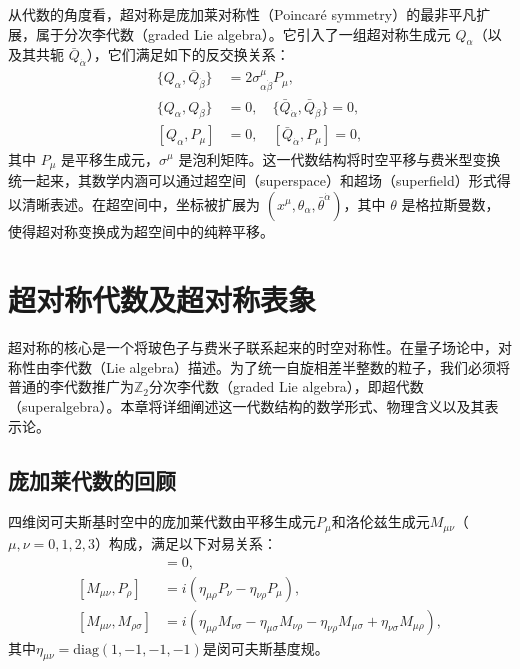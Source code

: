 从代数的角度看，超对称是庞加莱对称性（Poincaré symmetry）的最非平凡扩展，属于分次李代数（graded Lie algebra）。它引入了一组超对称生成元 $Q_\alpha$（以及其共轭 $\bar{Q}_{\dot{\alpha}}$），它们满足如下的反交换关系：
\begin{align}
\{ Q_\alpha, \bar{Q}_{\dot{\beta}} \} &= 2 \sigma^\mu_{\alpha\dot{\beta}} P_\mu, \\
\{ Q_\alpha, Q_\beta \} &= 0, \quad \{ \bar{Q}_{\dot{\alpha}}, \bar{Q}_{\dot{\beta}} \} = 0, \\
[ Q_\alpha, P_\mu ] &= 0, \quad [ \bar{Q}_{\dot{\alpha}}, P_\mu ] = 0,
\end{align}
其中 $P_\mu$ 是平移生成元，$\sigma^\mu$ 是泡利矩阵。这一代数结构将时空平移与费米型变换统一起来，其数学内涵可以通过超空间（superspace）和超场（superfield）形式得以清晰表述。在超空间中，坐标被扩展为 $(x^\mu, \theta_\alpha, \bar{\theta}^{\dot{\alpha}})$，其中 $\theta$ 是格拉斯曼数，使得超对称变换成为超空间中的纯粹平移。
\section{超对称代数及超对称表象}
\label{sec:susy_algebra}

超对称的核心是一个将玻色子与费米子联系起来的时空对称性。在量子场论中，对称性由李代数（Lie algebra）描述。为了统一自旋相差半整数的粒子，我们必须将普通的李代数推广为$\mathbb{Z}_2$分次李代数（graded Lie algebra），即超代数（superalgebra）。本章将详细阐述这一代数结构的数学形式、物理含义以及其表示论。

\subsection*{庞加莱代数的回顾}

四维闵可夫斯基时空中的庞加莱代数由平移生成元$P_\mu$和洛伦兹生成元$M_{\mu\nu}$（$\mu,\nu=0,1,2,3$）构成，满足以下对易关系：
\begin{align}
[P_\mu, P_\nu] &= 0, \\
[M_{\mu\nu}, P_\rho] &= i(\eta_{\mu\rho}P_\nu - \eta_{\nu\rho}P_\mu), \\
[M_{\mu\nu}, M_{\rho\sigma}] &= i(\eta_{\mu\rho}M_{\nu\sigma} - \eta_{\mu\sigma}M_{\nu\rho} - \eta_{\nu\rho}M_{\mu\sigma} + \eta_{\nu\sigma}M_{\mu\rho}),
\end{align}
其中$\eta_{\mu\nu}=\mathrm{diag}(1,-1,-1,-1)$是闵可夫斯基度规。

